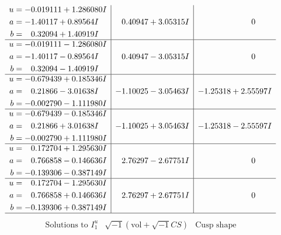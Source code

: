 \documentclass[1p]{elsarticle_modified}
\theoremstyle{definition}
\newcommand{\I}{\sqrt{-1}}
\begin{document}
$$\begin{array}{c|c|c}
\begin{aligned}
u &= -0.019111 + 1.286080 I \\
a &= -1.40117 + 0.89564 I \\
b &= \phantom{-}0.32094 + 1.40919 I\end{aligned}
 & \phantom{-}0.40947 + 3.05315 I & \phantom{-0.000000 } 0 \\ \hline\begin{aligned}
u &= -0.019111 - 1.286080 I \\
a &= -1.40117 - 0.89564 I \\
b &= \phantom{-}0.32094 - 1.40919 I\end{aligned}
 & \phantom{-}0.40947 - 3.05315 I & \phantom{-0.000000 } 0 \\ \hline\begin{aligned}
u &= -0.679439 + 0.185346 I \\
a &= \phantom{-}0.21866 - 3.01638 I \\
b &= -0.002790 - 1.111980 I\end{aligned}
 & -1.10025 - 3.05463 I & -1.25318 + 2.55597 I \\ \hline\begin{aligned}
u &= -0.679439 - 0.185346 I \\
a &= \phantom{-}0.21866 + 3.01638 I \\
b &= -0.002790 + 1.111980 I\end{aligned}
 & -1.10025 + 3.05463 I & -1.25318 - 2.55597 I \\ \hline\begin{aligned}
u &= \phantom{-}0.172704 + 1.295630 I \\
a &= \phantom{-}0.766858 - 0.146636 I \\
b &= -0.139306 - 0.387149 I\end{aligned}
 & \phantom{-}2.76297 - 2.67751 I & \phantom{-0.000000 } 0 \\ \hline\begin{aligned}
u &= \phantom{-}0.172704 - 1.295630 I \\
a &= \phantom{-}0.766858 + 0.146636 I \\
b &= -0.139306 + 0.387149 I\end{aligned}
 & \phantom{-}2.76297 + 2.67751 I & \phantom{-0.000000 } 0\\
 \hline 
 \end{array}$$\newpage$$\begin{array}{c|c|c}  
\text{Solutions to }I^u_{1}& \I (\text{vol} + \sqrt{-1}CS) & \text{Cusp shape}\\
 \hline 
\begin{aligned}

\end{aligned}
\end{array}$$
\end{document}
